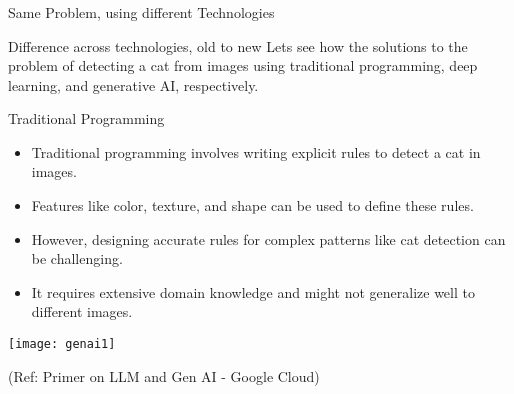 \begin{frame}[fragile]\frametitle{}
\begin{center}
{\Large Same Problem, using different Technologies}
\end{center}
\end{frame}


\begin{frame}[fragile]{Difference across technologies, old to new}
Lets see how the solutions to the problem of detecting a cat from images using traditional programming, deep learning, and generative AI, respectively.
\end{frame}

\begin{frame}[fragile]{Traditional Programming}
  \begin{itemize}
    \item Traditional programming involves writing explicit rules to detect a cat in images.
    \item Features like color, texture, and shape can be used to define these rules.
    \item However, designing accurate rules for complex patterns like cat detection can be challenging.
    \item It requires extensive domain knowledge and might not generalize well to different images.
  \end{itemize}
  
\begin{center}
\texttt{[image: genai1]}
\end{center}

{\tiny (Ref: Primer on LLM and Gen AI - Google Cloud)}
  
\end{frame}

